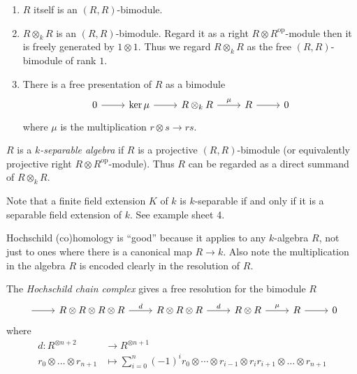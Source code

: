 \documentclass[a4paper]{article}
\newcommand{\op}{\mathrm{op}}
\begin{document}
\begin{note}\leavevmode
  \begin{enumerate}
  \item \(R\) itself is an \((R, R)\)-bimodule.
  \item \(R \otimes_k R\) is an \((R, R)\)-bimodule. Regard it as a right \(R \otimes R^\op\)-module then it is freely generated by \(1 \otimes 1\). Thus we regard \(R \otimes_k R\) as the free \((R, R)\)-bimodule of rank \(1\).
  \item There is a free presentation of \(R\) as a bimodule
    \[
      \begin{tikzcd}
        0 \ar[r] & \ker \mu \ar[r] & R \otimes_k R \ar[r, "\mu"] & R \ar[r] & 0
      \end{tikzcd}
    \]
    where \(\mu\) is the multiplication \(r \otimes s \to rs\).
  \end{enumerate}
\end{note}

\begin{definition}
  \(R\) is a \emph{\(k\)-separable algebra} if \(R\) is a projective \((R, R)\)-bimodule (or equivalently projective right \(R \otimes R^\op\)-module). Thus \(R\) can be regarded as a direct summand of \(R \otimes_k R\).
\end{definition}

Note that a finite field extension \(K\) of \(k\) is \(k\)-separable if and only if it is a separable field extension of \(k\). See example sheet 4.

\begin{remark}
  Hochschild (co)homology is ``good'' because it applies to any \(k\)-algebra \(R\), not just to ones where there is a canonical map \(R \to k\). Also note the multiplication in the algebra \(R\) is encoded clearly in the resolution of \(R\).
\end{remark}

\begin{definition}
  The \emph{Hochschild chain complex} gives a free resolution for the bimodule \(R\)
  \[
    \begin{tikzcd}
      \ar[r] & R \otimes R \otimes R \otimes R \ar[r, "d"] & R \otimes R \otimes R \ar[r, "d"] & R \otimes R \ar[r, "\mu"] & R \ar[r] & 0
    \end{tikzcd}
  \]
  where
  \begin{align*}
    d: R^{\otimes n + 2} &\to R^{\otimes n + 1} \\
    r_0 \otimes \dots \otimes r_{n + 1} &\mapsto \sum_{i = 0}^n (-1)^i r_0 \otimes \cdots \otimes r_{i - 1} \otimes r_ir_{i + 1} \otimes \dots \otimes r_{n + 1}
  \end{align*}
\end{definition}
\end{document}
